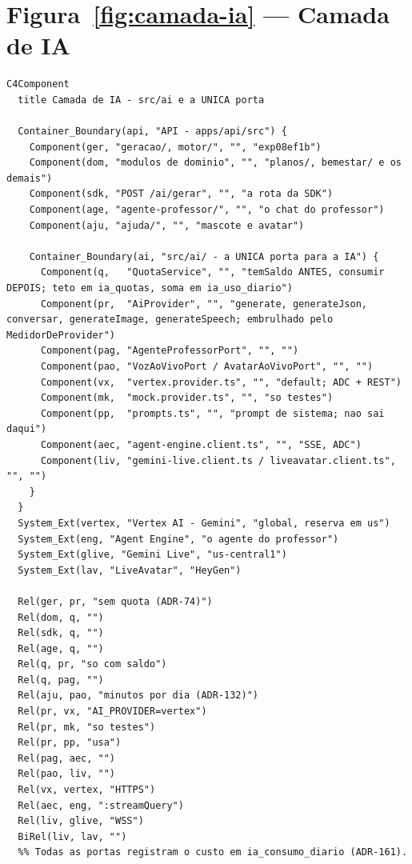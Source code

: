 \section{Figura~\ref{fig:camada-ia} --- Camada de IA}

\begin{lstlisting}[language=mermaid]
C4Component
  title Camada de IA - src/ai e a UNICA porta

  Container_Boundary(api, "API - apps/api/src") {
    Component(ger, "geracao/, motor/", "", "exp08ef1b")
    Component(dom, "modulos de dominio", "", "planos/, bemestar/ e os demais")
    Component(sdk, "POST /ai/gerar", "", "a rota da SDK")
    Component(age, "agente-professor/", "", "o chat do professor")
    Component(aju, "ajuda/", "", "mascote e avatar")

    Container_Boundary(ai, "src/ai/ - a UNICA porta para a IA") {
      Component(q,   "QuotaService", "", "temSaldo ANTES, consumir DEPOIS; teto em ia_quotas, soma em ia_uso_diario")
      Component(pr,  "AiProvider", "", "generate, generateJson, conversar, generateImage, generateSpeech; embrulhado pelo MedidorDeProvider")
      Component(pag, "AgenteProfessorPort", "", "")
      Component(pao, "VozAoVivoPort / AvatarAoVivoPort", "", "")
      Component(vx,  "vertex.provider.ts", "", "default; ADC + REST")
      Component(mk,  "mock.provider.ts", "", "so testes")
      Component(pp,  "prompts.ts", "", "prompt de sistema; nao sai daqui")
      Component(aec, "agent-engine.client.ts", "", "SSE, ADC")
      Component(liv, "gemini-live.client.ts / liveavatar.client.ts", "", "")
    }
  }
  System_Ext(vertex, "Vertex AI - Gemini", "global, reserva em us")
  System_Ext(eng, "Agent Engine", "o agente do professor")
  System_Ext(glive, "Gemini Live", "us-central1")
  System_Ext(lav, "LiveAvatar", "HeyGen")

  Rel(ger, pr, "sem quota (ADR-74)")
  Rel(dom, q, "")
  Rel(sdk, q, "")
  Rel(age, q, "")
  Rel(q, pr, "so com saldo")
  Rel(q, pag, "")
  Rel(aju, pao, "minutos por dia (ADR-132)")
  Rel(pr, vx, "AI_PROVIDER=vertex")
  Rel(pr, mk, "so testes")
  Rel(pr, pp, "usa")
  Rel(pag, aec, "")
  Rel(pao, liv, "")
  Rel(vx, vertex, "HTTPS")
  Rel(aec, eng, ":streamQuery")
  Rel(liv, glive, "WSS")
  BiRel(liv, lav, "")
  %% Todas as portas registram o custo em ia_consumo_diario (ADR-161).
\end{lstlisting}

